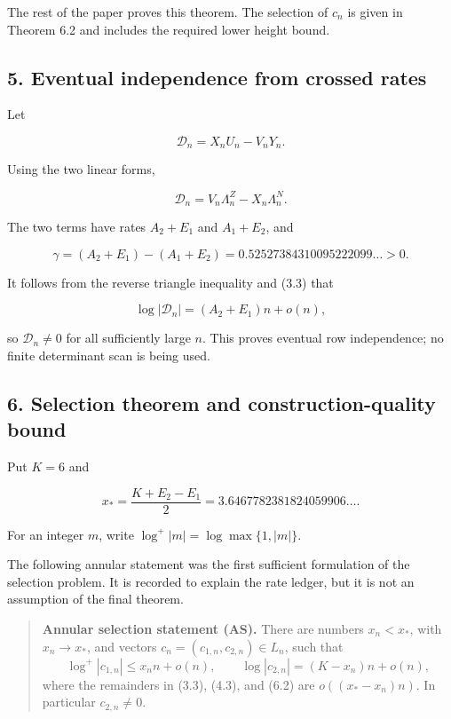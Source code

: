 \documentclass[
  11pt,
]{article}
\begin{document}
The rest of the paper proves this theorem. The selection of \(c_n\) is
given in Theorem 6.2 and includes the required lower height bound.

\hypertarget{eventual-independence-from-crossed-rates}{%
\subsection{5. Eventual independence from crossed
rates}\label{eventual-independence-from-crossed-rates}}

Let

\[
 \mathcal D_n=X_nU_n-V_nY_n.
 \tag{5.1}
\]

Using the two linear forms,

\[
 \mathcal D_n=V_n\Lambda_n^Z-X_n\Lambda_n^N.
 \tag{5.2}
\]

The two terms have rates \(A_2+E_1\) and \(A_1+E_2\), and

\[
 \gamma=(A_2+E_1)-(A_1+E_2)
 =0.52527384310095222099\ldots>0.
 \tag{5.3}
\]

It follows from the reverse triangle inequality and (3.3) that

\[
 \log|\mathcal D_n|=(A_2+E_1)n+o(n),
 \tag{5.4}
\]

so \(\mathcal D_n\ne0\) for all sufficiently large \(n\). This proves
eventual row independence; no finite determinant scan is being used.

\hypertarget{selection-theorem-and-construction-quality-bound}{%
\subsection{6. Selection theorem and construction-quality
bound}\label{selection-theorem-and-construction-quality-bound}}

Put \(K=6\) and

\[
 x_* =\frac{K+E_2-E_1}{2}
      =3.6467782381824059906\ldots.
 \tag{6.1}
\]

For an integer \(m\), write \(\log^+|m|=\log\max\{1,|m|\}\).

The following annular statement was the first sufficient formulation of
the selection problem. It is recorded to explain the rate ledger, but it
is not an assumption of the final theorem.

\begin{quote}
\textbf{Annular selection statement (AS).} There are numbers
\(x_n<x_*\), with \(x_n\to x_*\), and vectors
\(c_n=(c_{1,n},c_{2,n})\in L_n\), such that \[
\log^+|c_{1,n}|\le x_nn+o(n),\qquad
\log|c_{2,n}|=(K-x_n)n+o(n),                 \tag{6.2}
\] where the remainders in (3.3), (4.3), and (6.2) are
\(o((x_*-x_n)n)\). In particular \(c_{2,n}\ne0\).
\end{quote}
\end{document}
